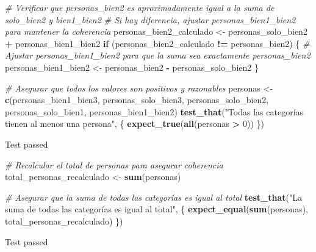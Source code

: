 \documentclass[
]{article}
\newenvironment{Shaded}{\begin{snugshade}}{\end{snugshade}}
\newcommand{\CommentTok}[1]{\textcolor[rgb]{0.56,0.35,0.01}{\textit{#1}}}
\newcommand{\ControlFlowTok}[1]{\textcolor[rgb]{0.13,0.29,0.53}{\textbf{#1}}}
\newcommand{\DecValTok}[1]{\textcolor[rgb]{0.00,0.00,0.81}{#1}}
\newcommand{\FunctionTok}[1]{\textcolor[rgb]{0.13,0.29,0.53}{\textbf{#1}}}
\newcommand{\NormalTok}[1]{#1}
\newcommand{\OtherTok}[1]{\textcolor[rgb]{0.56,0.35,0.01}{#1}}
\newcommand{\SpecialCharTok}[1]{\textcolor[rgb]{0.81,0.36,0.00}{\textbf{#1}}}
\newcommand{\StringTok}[1]{\textcolor[rgb]{0.31,0.60,0.02}{#1}}
\begin{document}
\begin{Shaded}
\begin{Highlighting}[]
\CommentTok{\# Verificar que personas\_bien2 es aproximadamente igual a la suma de solo\_bien2 y bien1\_bien2}
\CommentTok{\# Si hay diferencia, ajustar personas\_bien1\_bien2 para mantener la coherencia}
\NormalTok{personas\_bien2\_calculado }\OtherTok{\textless{}{-}}\NormalTok{ personas\_solo\_bien2 }\SpecialCharTok{+}\NormalTok{ personas\_bien1\_bien2}
\ControlFlowTok{if}\NormalTok{ (personas\_bien2\_calculado }\SpecialCharTok{!=}\NormalTok{ personas\_bien2) \{}
  \CommentTok{\# Ajustar personas\_bien1\_bien2 para que la suma sea exactamente personas\_bien2}
\NormalTok{  personas\_bien1\_bien2 }\OtherTok{\textless{}{-}}\NormalTok{ personas\_bien2 }\SpecialCharTok{{-}}\NormalTok{ personas\_solo\_bien2}
\NormalTok{\}}

\CommentTok{\# Asegurar que todos los valores son positivos y razonables}
\NormalTok{personas }\OtherTok{\textless{}{-}} \FunctionTok{c}\NormalTok{(personas\_bien1\_bien3, personas\_solo\_bien3, personas\_solo\_bien2, personas\_solo\_bien1, personas\_bien1\_bien2)}
\FunctionTok{test\_that}\NormalTok{(}\StringTok{"Todas las categorías tienen al menos una persona"}\NormalTok{, \{}
  \FunctionTok{expect\_true}\NormalTok{(}\FunctionTok{all}\NormalTok{(personas }\SpecialCharTok{\textgreater{}} \DecValTok{0}\NormalTok{))}
\NormalTok{\})}
\end{Highlighting}
\end{Shaded}

Test passed

\begin{Shaded}
\begin{Highlighting}[]
\CommentTok{\# Recalcular el total de personas para asegurar coherencia}
\NormalTok{total\_personas\_recalculado }\OtherTok{\textless{}{-}} \FunctionTok{sum}\NormalTok{(personas)}

\CommentTok{\# Asegurar que la suma de todas las categorías es igual al total}
\FunctionTok{test\_that}\NormalTok{(}\StringTok{"La suma de todas las categorías es igual al total"}\NormalTok{, \{}
  \FunctionTok{expect\_equal}\NormalTok{(}\FunctionTok{sum}\NormalTok{(personas), total\_personas\_recalculado)}
\NormalTok{\})}
\end{Highlighting}
\end{Shaded}

Test passed
\end{document}

